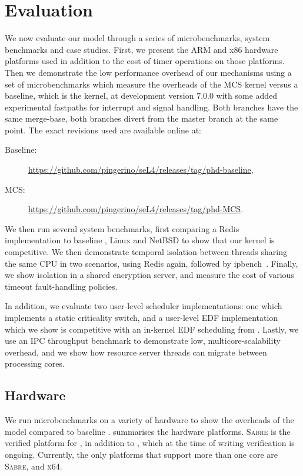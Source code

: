 \chapter{Evaluation}
\label{chap:evaluation}

We now evaluate our model through a series of microbenchmarks, system benchmarks and case studies.
First, we present the ARM and x86 hardware platforms used in addition to the cost of timer operations on those
platforms. Then we demonstrate the low performance overhead of our mechanisms using a set of 
microbenchmarks which measure the overheads of the MCS kernel versus a baseline, which is the \selfour
kernel, at development version 7.0.0 with some added experimental fastpaths for interrupt and signal
handling. Both branches have the same merge-base, \ie both branches divert from the master branch at
the same point. The exact revisions used are available online at:
\begin{description}
    \item[Baseline:] \url{https://github.com/pingerino/seL4/releases/tag/phd-baseline},
    \item[MCS:] \url{https://github.com/pingerino/seL4/releases/tag/phd-MCS}.
\end{description}

We then run several system benchmarks, first comparing a Redis~\citep{redis:url} 
implementation to baseline \selfour, Linux and NetBSD to show that our kernel is competitive.
We then demonstrate temporal
isolation between threads sharing the same CPU in two scenarios,
using Redis again, followed by ipbench~\citep{Wienand_Macpherson_04}. Finally, we show isolation in a
shared encryption server, and measure the cost of various timeout fault-handling policies. 

In addition, we evaluate two user-level scheduler implementations: one which implements a static
criticality switch, and a user-level \gls{EDF} implementation which we show is
competitive with an in-kernel \gls{EDF} scheduling from \litmus. Lastly, we use an \gls{IPC}
throughput benchmark to demonstrate low, multicore-scalability overhead, and we show 
how resource server threads can migrate between processing cores.

\section{Hardware}

We run microbenchmarks on a variety of hardware to show the overheads of the model compared to
baseline \selfour.  summarises the hardware platforms. \textsc{Sabre} is
the verified platform for \selfour, in addition to , which at the time of writing verification is
ongoing. Currently, the only platforms that support more than one core are \textsc{Sabre},
and \textsc{x64}.


